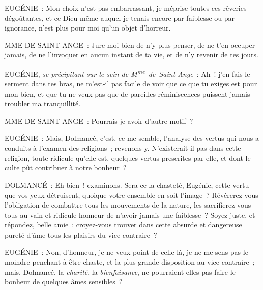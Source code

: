 \documentclass[french,twoside]{book} %
\begin{document}
EUGÉNIE : Mon choix n’est pas embarrassant, je méprise toutes ces rêveries dégoûtantes, et ce Dieu même auquel je tenais encore par faiblesse ou par ignorance, n’est plus pour moi qu’un objet d’horreur.\par
MME DE SAINT-ANGE : Jure-moi bien de n’y plus penser, de ne t’en occuper jamais, de ne l’invoquer en aucun instant de ta vie, et de n’y revenir de tes jours.\par
EUGÉNIE, {\itshape se précipitant sur le sein de M\textsuperscript{me} de Saint-Ange} : Ah ! j’en fais le serment dans tes bras, ne m’est-il pas facile de voir que ce que tu exiges est pour mon bien, et que tu ne veux pas que de pareilles réminiscences puissent jamais troubler ma tranquillité.\par
MME DE SAINT-ANGE : Pourrais-je avoir d’autre motif ?\par
EUGÉNIE : Mais, Dolmancé, c’est, ce me semble, l’analyse des vertus qui nous a conduits à l’examen des religions ; revenons-y. N’existerait-il pas dans cette religion, toute ridicule qu’elle est, quelques vertus prescrites par elle, et dont le culte pût contribuer à notre bonheur ?\par
DOLMANCÉ : Eh bien ! examinons. Sera-ce la chasteté, Eugénie, cette vertu que vos yeux détruisent, quoique votre ensemble en soit l’image ? Révérerez-vous l’obligation de combattre tous les mouvements de la nature, les sacrifierez-vous tous au vain et ridicule honneur de n’avoir jamais une faiblesse ? Soyez juste, et répondez, belle amie : croyez-vous trouver dans cette absurde et dangereuse pureté d’âme tous les plaisirs du vice contraire ?\par
EUGÉNIE : Non, d’honneur, je ne veux point de celle-là, je ne me sens pas le moindre penchant à être chaste, et la plus grande disposition au vice contraire ; mais, Dolmancé, la {\itshape charité}, la {\itshape bienfaisance}, ne pourraient-elles pas faire le bonheur de quelques âmes sensibles ?\par
\end{document}
